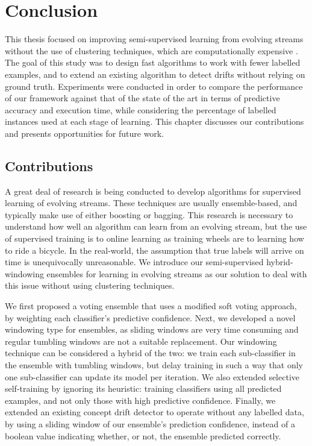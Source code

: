 
\chapter{Conclusion\label{chapter:conclusion}} %


This thesis focused on improving semi-supervised learning from evolving streams without the use of clustering techniques, which are computationally expensive \cite{krempl2014open}. The goal of this study was to design fast algorithms to work with fewer labelled examples, and to extend an existing algorithm to detect drifts without relying on ground truth. Experiments were conducted in order to compare the performance of our framework against that of the state of the art in terms of predictive accuracy and execution time, while considering the percentage of labelled instances used at each stage of learning. This chapter discusses our contributions and presents opportunities for future work.

 
\section{Contributions}
A great deal of research is being conducted to develop algorithms for supervised learning of evolving streams. These techniques are usually ensemble-based, and typically make use of either boosting or bagging. This research is necessary to understand how well an algorithm can learn from an evolving stream, but the use of supervised training is to online learning as training wheels are to learning how to ride a bicycle. In the real-world, the assumption that true labels will arrive on time is unequivocally unreasonable. We introduce our semi-supervised hybrid-windowing ensembles for learning in evolving streams as our solution to deal with this issue without using clustering techniques.

We first proposed a voting ensemble that uses a modified soft voting approach, by weighting each classifier’s predictive confidence. Next, we developed a novel windowing type for ensembles, as sliding windows are very time consuming and regular tumbling windows are not a suitable replacement. Our windowing technique can be considered a hybrid of the two: we train each sub-classifier in the ensemble with tumbling windows, but delay training in such a way that only one sub-classifier can update its model per iteration. We also extended selective self-training by ignoring its heuristic: training classifiers using all predicted examples, and not only those with high predictive confidence. Finally, we extended an existing concept drift detector to operate without any labelled data, by using a sliding window of our ensemble’s prediction confidence, instead of a boolean value indicating whether, or not, the ensemble predicted correctly.

